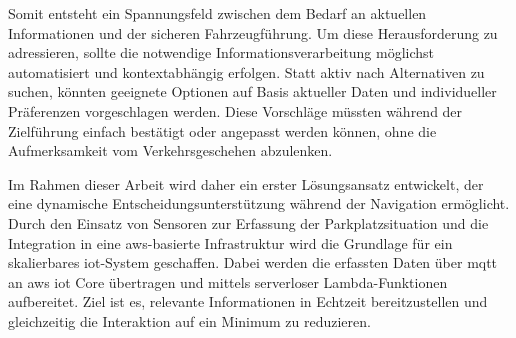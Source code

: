 Somit entsteht ein Spannungsfeld zwischen dem Bedarf an aktuellen Informationen und der sicheren Fahrzeugführung. Um diese Herausforderung zu adressieren, sollte die notwendige Informationsverarbeitung möglichst automatisiert und kontextabhängig erfolgen. Statt aktiv nach Alternativen zu suchen, könnten geeignete Optionen auf Basis aktueller Daten und individueller Präferenzen vorgeschlagen werden. Diese Vorschläge müssten während der Zielführung einfach bestätigt oder angepasst werden können, ohne die Aufmerksamkeit vom Verkehrsgeschehen abzulenken.

Im Rahmen dieser Arbeit wird daher ein erster Lösungsansatz entwickelt, der eine dynamische Entscheidungsunterstützung während der Navigation ermöglicht.
Durch den Einsatz von Sensoren zur Erfassung der Parkplatzsituation und die Integration in eine \ac{aws}-basierte Infrastruktur wird die Grundlage für ein skalierbares \ac{iot}-System geschaffen.
Dabei werden die erfassten Daten über \ac{mqtt} an \ac{aws} \ac{iot} Core übertragen und mittels serverloser Lambda-Funktionen aufbereitet. Ziel ist es, relevante Informationen in Echtzeit bereitzustellen und gleichzeitig die Interaktion auf ein Minimum zu reduzieren.